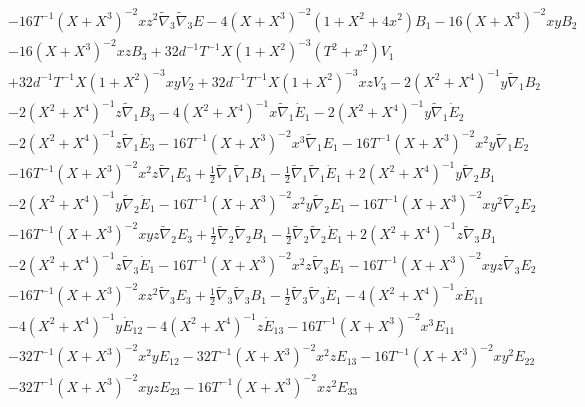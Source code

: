 \documentclass[10pt,letterpaper]{article}
\numberwithin{equation}{section}
\begin{document}
\begin{appendices}
\begin{eqnarray}
&& - 16 T^{-1} (X + X^3)^{-2} x z^2 \tilde{\nabla}_{3}\tilde{\nabla}_{3}E-4 (X + X^3)^{-2} (1 + X^2 + 4 x^2) B_{1} - 16 (X + X^3)^{-2} x y B_{2} \nonumber \\ 
&& - 16 (X + X^3)^{-2} x z B_{3} + 32 d^{-1} T^{-1} X (1 + X^2)^{-3} (T^2 + x^2) V_{1} \nonumber \\ 
&& + 32 d^{-1} T^{-1} X (1 + X^2)^{-3} x y V_{2} + 32 d^{-1} T^{-1} X (1 + X^2)^{-3} x z V_{3} - 2 (X^2 + X^4)^{-1} y \tilde{\nabla}_{1}B_{2} \nonumber \\ 
&& - 2 (X^2 + X^4)^{-1} z \tilde{\nabla}_{1}B_{3} - 4 (X^2 + X^4)^{-1} x \tilde{\nabla}_{1}\dot{E}_{1} - 2 (X^2 + X^4)^{-1} y \tilde{\nabla}_{1}\dot{E}_{2} \nonumber \\ 
&& - 2 (X^2 + X^4)^{-1} z \tilde{\nabla}_{1}\dot{E}_{3} - 16 T^{-1} (X + X^3)^{-2} x^3 \tilde{\nabla}_{1}E_{1} - 16 T^{-1} (X + X^3)^{-2} x^2 y \tilde{\nabla}_{1}E_{2} \nonumber \\ 
&& - 16 T^{-1} (X + X^3)^{-2} x^2 z \tilde{\nabla}_{1}E_{3} + \tfrac{1}{2} \tilde{\nabla}_{1}\tilde{\nabla}_{1}B_{1} -  \tfrac{1}{2} \tilde{\nabla}_{1}\tilde{\nabla}_{1}\dot{E}_{1} + 2 (X^2 + X^4)^{-1} y \tilde{\nabla}_{2}B_{1} \nonumber \\ 
&& - 2 (X^2 + X^4)^{-1} y \tilde{\nabla}_{2}\dot{E}_{1} - 16 T^{-1} (X + X^3)^{-2} x^2 y \tilde{\nabla}_{2}E_{1} - 16 T^{-1} (X + X^3)^{-2} x y^2 \tilde{\nabla}_{2}E_{2} \nonumber \\ 
&& - 16 T^{-1} (X + X^3)^{-2} x y z \tilde{\nabla}_{2}E_{3} + \tfrac{1}{2} \tilde{\nabla}_{2}\tilde{\nabla}_{2}B_{1} -  \tfrac{1}{2} \tilde{\nabla}_{2}\tilde{\nabla}_{2}\dot{E}_{1} + 2 (X^2 + X^4)^{-1} z \tilde{\nabla}_{3}B_{1} \nonumber \\ 
&& - 2 (X^2 + X^4)^{-1} z \tilde{\nabla}_{3}\dot{E}_{1} - 16 T^{-1} (X + X^3)^{-2} x^2 z \tilde{\nabla}_{3}E_{1} - 16 T^{-1} (X + X^3)^{-2} x y z \tilde{\nabla}_{3}E_{2} \nonumber \\ 
&& - 16 T^{-1} (X + X^3)^{-2} x z^2 \tilde{\nabla}_{3}E_{3} + \tfrac{1}{2} \tilde{\nabla}_{3}\tilde{\nabla}_{3}B_{1} -  \tfrac{1}{2} \tilde{\nabla}_{3}\tilde{\nabla}_{3}\dot{E}_{1}-4 (X^2 + X^4)^{-1} x \dot{E}_{11} \nonumber \\ 
&& - 4 (X^2 + X^4)^{-1} y \dot{E}_{12} - 4 (X^2 + X^4)^{-1} z \dot{E}_{13} - 16 T^{-1} (X + X^3)^{-2} x^3 E_{11} \nonumber \\ 
&& - 32 T^{-1} (X + X^3)^{-2} x^2 y E_{12} - 32 T^{-1} (X + X^3)^{-2} x^2 z E_{13} - 16 T^{-1} (X + X^3)^{-2} x y^2 E_{22} \nonumber \\ 
&& - 32 T^{-1} (X + X^3)^{-2} x y z E_{23} - 16 T^{-1} (X + X^3)^{-2} x z^2 E_{33}

\end{eqnarray}
\end{appendices}
\end{document}
